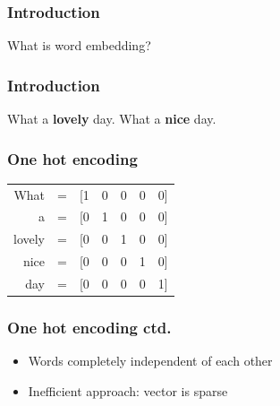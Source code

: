 \begin{frame}
	\frametitle{Introduction}
	
	\begin{center}
		\Huge {What is word embedding?}
	\end{center}
\end{frame}



\begin{frame}
	\frametitle{Introduction}
	
	
		\huge {What a \textbf{lovely} day.}
		 \newline
		\huge{What a \textbf{nice} day.}

\end{frame}

\begin{frame}
	\frametitle{One hot encoding}
	
\begin{table}[h]
	\hspace{15mm}
	\huge
	\begin{tabular}{rcccccc}
		What & = & [1 & 0 & 0 & 0 & 0] \\
		a & = & [0 &  1 &  0 &  0 & 0] \\
		lovely & = & [0 & 0& 1& 0& 0] \\
		nice & = & [0 &0& 0& 1& 0] \\
		day & = & [0 &0& 0& 0& 1] \\
	\end{tabular}
\end{table}


\end{frame}

\begin{frame}
\frametitle{One hot encoding ctd.}

	\begin{itemize}
		\item Words completely independent of each other
		\item Inefficient approach: vector is sparse
	\end{itemize}

\end{frame}


